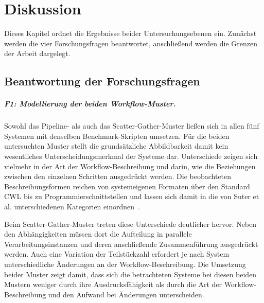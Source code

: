 
\chapter{Diskussion}
\label{sec:diskussion}

Dieses Kapitel ordnet die Ergebnisse beider Untersuchungsebenen
ein. Zunächst werden die vier Forschungsfragen beantwortet,
anschließend werden die Grenzen der Arbeit dargelegt.

\section{Beantwortung der Forschungsfragen}
\label{sec:diskussion:fragen}

\paragraph{F1: Modellierung der beiden Workflow-Muster.}
Sowohl das Pipeline- als auch das Scatter-Gather-Muster ließen sich
in allen fünf Systemen mit denselben Benchmark-Skripten umsetzen.
Für die beiden untersuchten Muster stellt die grundsätzliche
Abbildbarkeit damit kein wesentliches Unterscheidungsmerkmal der
Systeme dar. Unterschiede zeigen sich vielmehr in der Art der
Workflow-Beschreibung und darin, wie die Beziehungen zwischen den
einzelnen Schritten ausgedrückt werden. Die
beobachteten Beschreibungsformen reichen von systemeigenen Formaten
über den Standard CWL bis zu Programmierschnittstellen und lassen
sich damit in die von Suter et al. unterschiedenen Kategorien
einordnen~\cite[S.~8]{suter2026terminology}.

Beim Scatter-Gather-Muster treten diese Unterschiede deutlicher
hervor. Neben den Abhängigkeiten müssen dort die Aufteilung in
parallele Verarbeitungsinstanzen und deren anschließende
Zusammenführung ausgedrückt werden. Auch eine Variation der
Teilstückzahl erfordert je nach System unterschiedliche Änderungen
an der Workflow-Beschreibung. Die Umsetzung beider Muster zeigt
damit, dass sich die betrachteten Systeme bei diesen beiden Mustern
weniger durch ihre Ausdrucksfähigkeit als durch die Art der
Workflow-Beschreibung und den Aufwand bei Änderungen unterscheiden.


